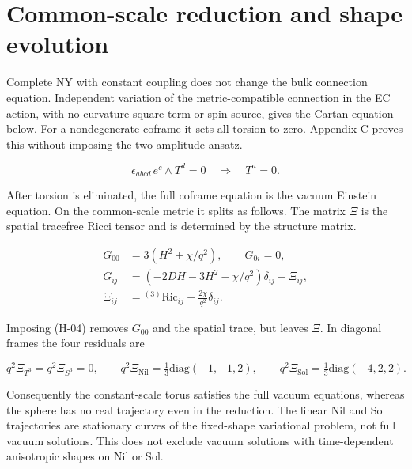 \section{Common-scale reduction and shape evolution}

Complete NY with constant coupling does not change the bulk connection equation. Independent variation of the metric-compatible connection in the EC action, with no curvature-square term or spin source, gives the Cartan equation below. For a nondegenerate coframe it sets all torsion to zero. Appendix C proves this without imposing the two-amplitude ansatz.

\begin{equation}\tag{E-01}\label{eq:E-01}
\epsilon_{abcd}\,e^c\wedge T^d=0
\quad\Longrightarrow\quad T^a=0.
\end{equation}

After torsion is eliminated, the full coframe equation is the vacuum Einstein equation. On the common-scale metric it splits as follows. The matrix $\Xi$ is the spatial tracefree Ricci tensor and is determined by the structure matrix.

\begin{equation}\tag{E-02}\label{eq:E-02}
\begin{aligned}
G_{00}&=3(H^2+\chi/q^2),\qquad G_{0i}=0,\\
G_{ij}&=(-2DH-3H^2-\chi/q^2)\delta_{ij}+\Xi_{ij},\\
\Xi_{ij}&={}^{(3)}\mathrm{Ric}_{ij}-\frac{2\chi}{q^2}\delta_{ij}.
\end{aligned}
\end{equation}

Imposing (H-04) removes $G_{00}$ and the spatial trace, but leaves $\Xi$. In diagonal frames the four residuals are

\begin{equation}\tag{E-03}\label{eq:E-03}
q^2\Xi_{T^3}=q^2\Xi_{S^3}=0,\qquad
q^2\Xi_{\mathrm{Nil}}=\tfrac13\mathrm{diag}(-1,-1,2),\qquad
q^2\Xi_{\mathrm{Sol}}=\tfrac13\mathrm{diag}(-4,2,2).
\end{equation}

Consequently the constant-scale torus satisfies the full vacuum equations, whereas the sphere has no real trajectory even in the reduction. The linear Nil and Sol trajectories are stationary curves of the fixed-shape variational problem, not full vacuum solutions. This does not exclude vacuum solutions with time-dependent anisotropic shapes on Nil or Sol.

